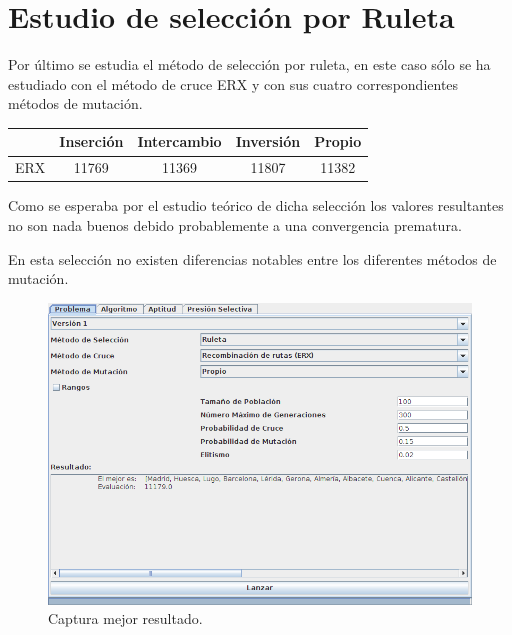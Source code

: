 \documentclass[12pt]{article}
\begin{document}
\section{Estudio de selección por Ruleta}	

	 Por último se estudia el método de selección por ruleta, en este caso sólo se ha estudiado con el método de cruce ERX y con sus cuatro correspondientes métodos de mutación.

\begin{table}[H]
\begin{center}
\begin{tabular}{|ccccc|} \hline
	   & Inserción & Intercambio & Inversión & Propio \\  \hline
ERX    & 11769 & 11369 & 11807 & 11382 \\  \hline
\end{tabular}
\end{center}
\end{table}

	Como se esperaba por el estudio teórico de dicha selección los valores resultantes no son nada buenos debido probablemente a una convergencia prematura.

	En esta selección no existen diferencias notables entre los diferentes métodos de mutación.

\begin{figure}[H]
\centering
\includegraphics[scale=0.4]{graficas/fig3}
\caption{Captura mejor resultado.}
\label{fig}
\end{figure}
\end{document}
